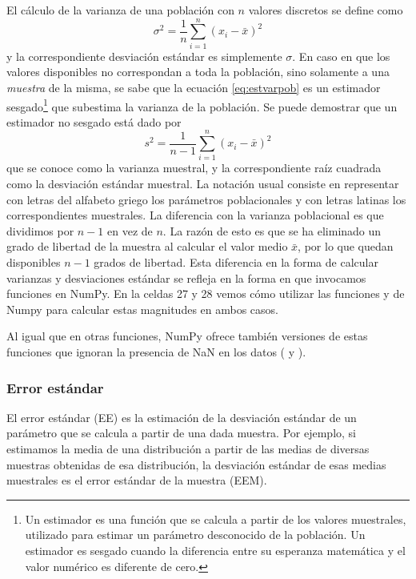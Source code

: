 El cálculo de la varianza de una población con $n$ valores discretos se define como
\begin{equation}\label{eq:estvarpob}
 \sigma^2 = \frac{1}{n} \sum_{i=1}^n (x_i - \bar{x})^2
\end{equation}
y la correspondiente desviación estándar es simplemente $\sigma$. En caso en que los valores disponibles no correspondan a toda la población, sino solamente a una \textit{muestra} de la misma, se sabe que la ecuación \eqref{eq:estvarpob} es un estimador sesgado\footnote{Un estimador es una función que se calcula a partir de los valores muestrales, utilizado para estimar un parámetro desconocido de la población. Un estimador es sesgado cuando la diferencia entre su esperanza matemática y el valor numérico es diferente de cero.} que subestima la varianza de la población. Se puede demostrar que un estimador no sesgado está dado por
\begin{equation}\label{eq:estvarsam}
 s^2 = \frac{1}{n-1} \sum_{i=1}^n (x_i - \bar{x})^2
\end{equation}
que se conoce como la varianza muestral, y la correspondiente raíz cuadrada como la desviación estándar muestral. La notación usual consiste en representar con letras del alfabeto griego los parámetros poblacionales y con letras latinas los correspondientes muestrales. La diferencia con la varianza poblacional es que dividimos por $n-1$ en vez de $n$. La razón de esto es que se ha eliminado un grado de libertad de la muestra al calcular el valor medio $\bar{x}$, por lo que quedan disponibles $n-1$ grados de libertad. Esta diferencia en la forma de calcular varianzas y desviaciones estándar se refleja en la forma en que invocamos funciones en NumPy. En la celdas 27 y 28 vemos cómo utilizar las funciones  y  de Numpy para calcular estas magnitudes en ambos casos.


Al igual que en otras funciones, NumPy ofrece también versiones de estas funciones que ignoran la presencia de NaN en los datos ( y ).


\subsubsection{Error estándar}

El error estándar (EE) es la estimación de la desviación estándar de un parámetro que se calcula a partir de una dada muestra. Por ejemplo, si estimamos la media de una distribución a partir de las medias de diversas muestras obtenidas de esa distribución, la desviación estándar de esas medias muestrales es el error estándar de la muestra (EEM).

